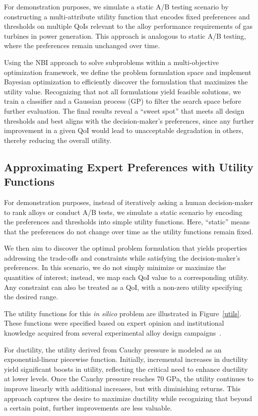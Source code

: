 \documentclass[final,5p,times,twocolumn]{elsarticle}
\begin{document}
For demonstration purposes, we simulate a static A/B testing scenario by constructing a multi-attribute utility function that encodes fixed preferences and thresholds on multiple QoIs relevant to the alloy performance requirements of gas turbines in power generation. This approach is analogous to static A/B testing, where the preferences remain unchanged over time.

Using the NBI approach to solve subproblems within a multi-objective optimization framework, we define the problem formulation space and implement Bayesian optimization to efficiently discover the formulation that maximizes the utility value. Recognizing that not all formulations yield feasible solutions, we train a classifier and a Gaussian process (GP) to filter the search space before further evaluation. The final results reveal a “sweet spot” that meets all design thresholds and best aligns with the decision-maker’s preferences, since any further improvement in a given QoI would lead to unacceptable degradation in others, thereby reducing the overall utility.

\subsection{Approximating Expert Preferences with Utility Functions}
For demonstration purposes, instead of iteratively asking a human decision-maker to rank alloys or conduct A/B tests, we simulate a static scenario by encoding the preferences and thresholds into simple utility functions. Here, ``static'' means that the preferences do not change over time as the utility functions remain fixed.

We then aim to discover the optimal problem formulation that yields properties addressing the trade-offs and constraints while satisfying the decision-maker's preferences. In this scenario, we do not simply minimize or maximize the quantities of interest; instead, we map each QoI value to a corresponding utility. Any constraint can also be treated as a QoI, with a non-zero utility specifying the desired range.

The utility functions for this \emph{in silico} problem are illustrated in Figure~\ref{utils}. These functions were specified based on expert opinion and institutional knowledge acquired from several experimental alloy design campaigns~\cite{acemi2024multi,hastings2024interoperable,mulukutla2024illustrating}.

For ductility, the utility derived from Cauchy pressure is modeled as an exponential-linear piecewise function. Initially, incremental increases in ductility yield significant boosts in utility, reflecting the critical need to enhance ductility at lower levels. Once the Cauchy pressure reaches 70 GPa, the utility continues to improve linearly with additional increases, but with diminishing returns. This approach captures the desire to maximize ductility while recognizing that beyond a certain point, further improvements are less valuable.
\end{document}
